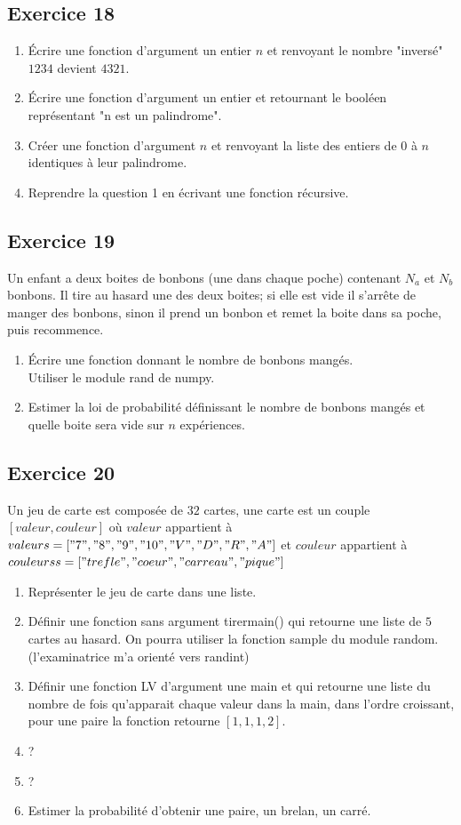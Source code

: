 \documentclass[10pt,fleqn]{article} %
\begin{document}
\begin{multicols}{2}
\subsection*{Exercice 18}
\begin{enumerate}
\item Écrire une fonction d'argument  un entier $n$ et renvoyant le nombre "inversé"
$1234$ devient $4321$.
\item Écrire une fonction d'argument un entier et retournant le booléen représentant 
"n est un palindrome".
\item Créer une fonction d'argument $n$ et renvoyant la liste des entiers de $0$ à 
$n$ identiques à leur palindrome.
\item Reprendre la question 1 en écrivant une fonction récursive.
\end{enumerate}

\subsection*{Exercice 19}
Un enfant a deux boites de bonbons (une dans chaque poche) contenant 
$N_a$ et $N_b$ bonbons. Il tire au hasard une des deux boites; si elle est vide 
il s'arrête de manger des bonbons, sinon il prend un bonbon et remet la boite dans 
sa poche, puis recommence.
\begin{enumerate}
\item Écrire une fonction donnant le nombre de bonbons mangés.\\
Utiliser le module rand de numpy.
\item Estimer la loi de probabilité définissant le nombre de bonbons mangés et 
quelle boite sera vide sur $n$ expériences.
\end{enumerate}

\subsection*{Exercice 20}
Un jeu de carte est composée de $32$ cartes, une carte est un couple $[valeur,couleur]$
où $valeur$ appartient à $valeurs=["7","8","9","10","V","D","R","A"]$
et $couleur$ appartient à $couleurss=["trefle","coeur","carreau","pique"]$
\begin{enumerate}
 \item Représenter le jeu de carte dans une liste.
 \item Définir une fonction sans argument tirermain() qui retourne une liste de $5$ cartes au hasard. On pourra utiliser la fonction sample du module random.
 (l'examinatrice m'a orienté vers randint)
\item Définir une fonction LV d'argument une main et qui retourne une liste du nombre de fois qu'apparait chaque valeur dans la main, dans l'ordre croissant, pour une paire 
la fonction retourne $[1,1,1,2]$.
\item ?
\item ?
\item Estimer la probabilité d'obtenir une paire, un brelan, un carré.
 \end{enumerate}
\end{multicols}
\end{document}
